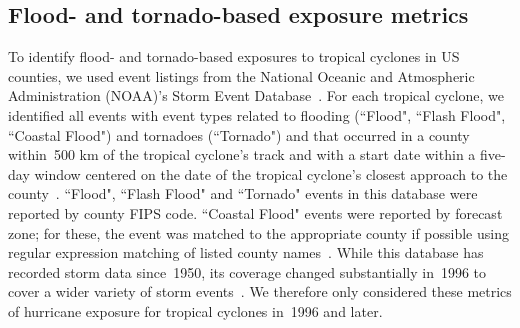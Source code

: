 \subsection*{Flood- and tornado-based exposure metrics}

To identify flood- and tornado-based exposures to tropical cyclones in \ac{US}
counties, we used event listings from the National Oceanic and Atmospheric
Administration (NOAA)'s Storm Event Database~\parencite{stormevents}. For each
tropical cyclone, we identified all events with event types related to flooding
(``Flood", ``Flash Flood", ``Coastal Flood") and tornadoes (``Tornado") and
that occurred in a county within~500 \si{\kilo\metre} of the tropical cyclone's
track and with a start date within a five-day window centered on the date of
the tropical cyclone's closest approach to the
county~\parencite{hurricaneexposuredata}. ``Flood", ``Flash Flood" and
``Tornado" events in this database were reported by county \ac{FIPS} code.
``Coastal Flood" events were reported by forecast zone; for these, the event
was matched to the appropriate county if possible using regular expression
matching of listed county names~\parencite{noaastormevents}. While this
database has recorded storm data since~1950, its coverage changed substantially
in~1996 to cover a wider variety of storm events~\parencite{stormevents}. We
therefore only considered these metrics of hurricane exposure for tropical
cyclones in~1996 and later.

